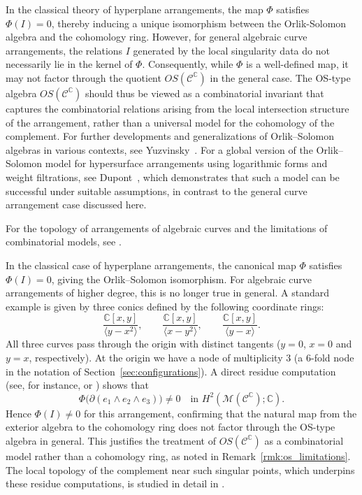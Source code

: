 \documentclass[article,11pt]{amsart} \numberwithin{equation}{section}
\numberwithin{equation}{section}
\begin{document}
{\begin{rk}\label{rmk:os_limitations}
	In the classical theory of hyperplane arrangements, the map $\Phi$ satisfies $\Phi(I) = 0$, thereby inducing a unique isomorphism between the Orlik-Solomon algebra and the cohomology ring. However, for general algebraic curve arrangements, the relations $I$ generated by the local singularity data do not necessarily lie in the kernel of $\Phi$. Consequently, while $\Phi$ is a well-defined map, it may not factor through the quotient $OS(\mathcal{C}^\mathbb{C})$ in the general case. The OS-type algebra $OS(\mathcal{C}^\mathbb{C})$ should thus be viewed as a combinatorial invariant that captures the combinatorial relations arising from the local intersection structure of the arrangement, rather than a universal model for the cohomology of the complement. For further developments and generalizations of Orlik–Solomon algebras in various contexts, see Yuzvinsky~\cite{Yuzvinsky}. For a global version of the Orlik–Solomon model for hypersurface arrangements using logarithmic forms and weight filtrations, see Dupont~\cite{Dupont2015}, which demonstrates that such a model can be successful under suitable assumptions, in contrast to the general curve arrangement case discussed here.
\end{rk}

For the topology of arrangements of algebraic curves and the limitations of combinatorial models, see \cite{Randell83}.

In the classical case of hyperplane arrangements, the canonical map $\Phi$ satisfies $\Phi(I)=0$, giving the Orlik–Solomon isomorphism. For algebraic curve arrangements of higher degree, this is no longer true in general. A standard example is given by three conics defined by the following coordinate rings:
\[
\frac{\mathbb{C}[x,y]}{\langle y-x^2\rangle},\qquad
\frac{\mathbb{C}[x,y]}{\langle x-y^2\rangle},\qquad
\frac{\mathbb{C}[x,y]}{\langle y-x\rangle}.
\]
All three curves pass through the origin with distinct tangents ($y=0$, $x=0$ and $y=x$, respectively). At the origin we have a node of multiplicity $3$ (a $6$-fold node in the notation of Section~\ref{sec:configurations}). A direct residue computation (see, for instance, \cite{Randell83} or \cite[Chapter~5]{dimca}) shows that
\[
\Phi\bigl(\partial(e_1\wedge e_2\wedge e_3)\bigr) \neq 0
\quad\text{in } H^2(\mathcal{M}(\mathcal{C}^{\mathbb{C}});\mathbb{C}).
\]
Hence $\Phi(I)\neq 0$ for this arrangement, confirming that the natural map from the exterior algebra to the cohomology ring does not factor through the OS-type algebra in general. This justifies the treatment of $OS(\mathcal{C}^{\mathbb{C}})$ as a combinatorial model rather than a cohomology ring, as noted in Remark~\ref{rmk:os_limitations}.
 The local topology of the complement near such singular points, which underpins these residue computations, is studied in detail in \cite{Hamm1971}.
 
}
\end{document}
